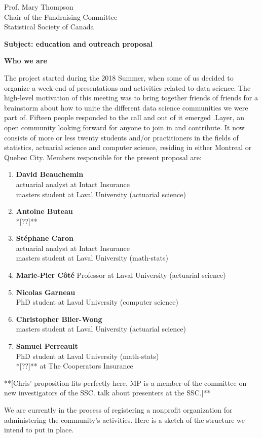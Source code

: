 \documentclass[11pt, a4paper]{letter} %
\begin{document}
\begin{letter}{
	Prof. Mary Thompson\\
	Chair of the Fundraising Committee\\
	Statistical Society of Canada
	
	\bigskip
	\textbf{Subject: education and outreach proposal}%
}
\bigskip
\noindent \textbf{Who we are}

The project started during the 2018 Summer, when some of us decided to organize a week-end of presentations and activities related to data science. The high-level motivation of this meeting was to bring together friends of friends for a brainstorm about how to unite the different data science communities we were part of. Fifteen people responded to the call and out of it emerged .Layer, an open community looking forward for anyone to join in and contribute. It now consists of more or less twenty students and/or practitioners in the fields of statistics, actuarial science and computer science, residing in either Montreal or Quebec City. Members responsible for the present proposal are:
\begin{enumerate}
	\item[] \textbf{David Beauchemin}\\
	\quad actuarial analyst at Intact Insurance\\
	\quad masters student at Laval University (actuarial science)
	\item[] \textbf{Antoine Buteau}\\
	\quad **[??]**
	\item[] \textbf{Stéphane Caron}\\
	\quad actuarial analyst at Intact Insurance\\
	\quad masters student at Laval University (math-stats)
	\item[] \textbf{Marie-Pier Côté}
	\quad Professor at Laval University (actuarial science)\\
	\item[] \textbf{Nicolas Garneau}\\
	\quad PhD student at Laval University (computer science)
	\item[] \textbf{Christopher Blier-Wong}\\
	\quad masters student at Laval University (actuarial science)
	\item[] \textbf{Samuel Perreault}\\
	\quad PhD student at Laval University (math-stats)\\
	\quad **[??]** at The Cooperators Insurance
\end{enumerate}


	**[Chris' proposition fits perfectly here. MP is a member of the committee on new investigators of the SSC. talk about presenters at the SSC.]**


We are currently in the process of registering a nonprofit organization for administering the community's activities. Here is a sketch of the structure we intend to put in place.


\end{letter}
\end{document}
